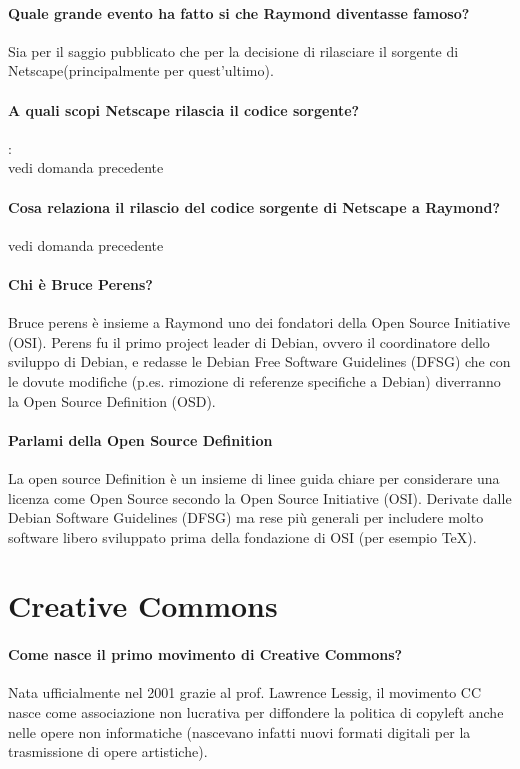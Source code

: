 \documentclass[a4paper]{article}
\begin{document}
		\paragraph{Quale grande evento ha fatto si che Raymond diventasse famoso?\\}
		Sia per il saggio pubblicato che per la decisione di rilasciare il sorgente di Netscape(principalmente per quest'ultimo).
		
		\paragraph{A quali scopi Netscape rilascia il codice sorgente?}
		: \\ vedi domanda precedente
		\paragraph{Cosa relaziona il rilascio del codice sorgente di Netscape a Raymond?}
		 vedi domanda precedente
		
		\paragraph{Chi è Bruce Perens?}
		Bruce perens è insieme a Raymond uno dei fondatori della Open Source 
		Initiative (OSI). Perens fu il primo project leader di Debian, ovvero
		il coordinatore dello sviluppo di Debian, e redasse 
		le Debian Free Software Guidelines (DFSG) che con le dovute modifiche
		(p.es. rimozione di referenze specifiche a Debian) diverranno la 
		Open Source Definition (OSD).

		\paragraph{Parlami della Open Source Definition}
		La open source Definition è un insieme di linee guida chiare per 
		considerare una licenza come Open Source secondo la Open Source 
		Initiative (OSI). Derivate dalle Debian Software Guidelines (DFSG)
		ma rese più generali per includere molto software libero sviluppato 
		prima della fondazione di OSI (per esempio TeX).
		
	\section{Creative Commons}
	
		\paragraph{Come nasce il primo movimento di Creative Commons?}
			Nata ufficialmente nel 2001 grazie al prof. Lawrence Lessig, il movimento CC nasce come associazione non lucrativa per diffondere la politica di copyleft anche nelle opere non informatiche (nascevano infatti nuovi formati digitali per la trasmissione di opere artistiche). 
			
\end{document}
